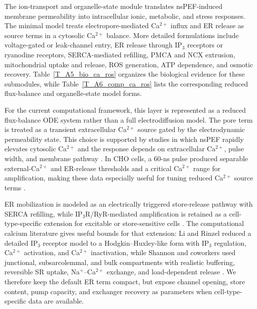 The ion-transport and organelle-state module translates nsPEF-induced membrane permeability into intracellular ionic, metabolic, and stress responses. The minimal model treats electropore-mediated Ca$^{2+}$ influx and ER release as source terms in a cytosolic Ca$^{2+}$ balance. More detailed formulations include voltage-gated or leak-channel entry, ER release through IP$_3$ receptors or ryanodine receptors, SERCA-mediated refilling, PMCA and NCX extrusion, mitochondrial uptake and release, ROS generation, ATP dependence, and osmotic recovery. Table~\ref{T_A5_bio_ca_ros} organizes the biological evidence for these submodules, while Table~\ref{T_A6_comp_ca_ros} lists the corresponding reduced flux-balance and organelle-state model forms.

For the current computational framework, this layer is represented as a reduced flux-balance ODE system rather than a full electrodiffusion model. The pore term is treated as a transient extracellular Ca$^{2+}$ source gated by the electrodynamic permeability state. This choice is supported by studies in which nsPEF rapidly elevates cytosolic Ca$^{2+}$ and the response depends on extracellular Ca$^{2+}$, pulse width, and membrane pathway \cite{vernier2003calcium,bagalkot2018membrane,yun2024modulating}. In CHO cells, a 60-ns pulse produced separable external-Ca$^{2+}$ and ER-release thresholds and a critical Ca$^{2+}$ range for amplification, making these data especially useful for tuning reduced Ca$^{2+}$ source terms \cite{semenov2013primary}.

ER mobilization is modeled as an electrically triggered store-release pathway with SERCA refilling, while IP$_3$R/RyR-mediated amplification is retained as a cell-type-specific extension for excitable or store-sensitive cells \cite{semenov2013recruitment,tolstykh2013activation,tolstykh2014pip2,wang2009cardiac,azarov2019excitation}. The computational calcium literature gives useful bounds for that extension: Li and Rinzel reduced a detailed IP$_3$ receptor model to a Hodgkin--Huxley-like form with IP$_3$ regulation, Ca$^{2+}$ activation, and Ca$^{2+}$ inactivation, while Shannon and coworkers used junctional, subsarcolemmal, and bulk compartments with realistic buffering, reversible SR uptake, Na$^+$--Ca$^{2+}$ exchange, and load-dependent release \cite{li1994equations,shannon2004mathematical}. We therefore keep the default ER term compact, but expose channel opening, store content, pump capacity, and exchanger recovery as parameters when cell-type-specific data are available.

